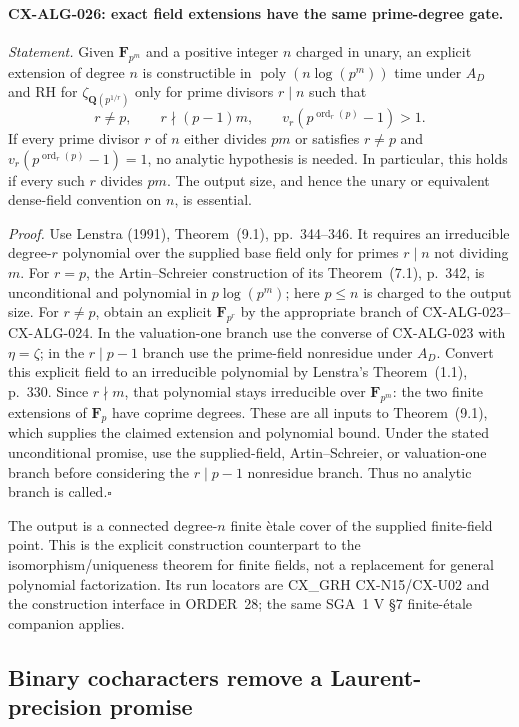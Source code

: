 \documentclass[11pt,a4paper]{article}
\begin{document}
\paragraph{CX-ALG-026: exact field extensions have the same prime-degree gate.}
\emph{Statement.} Given $\mathbf F_{p^m}$ and a positive integer $n$
charged in unary, an explicit extension of degree $n$ is constructible
in $\operatorname{poly}(n\log(p^m))$ time under $A_D$ and RH for
$\zeta_{\mathbf Q(p^{1/r})}$ only for prime divisors $r\mid n$ such that
\[
       r\ne p,\qquad r\nmid(p-1)m,\qquad
               v_r(p^{\operatorname{ord}_r(p)}-1)>1.
\]
If every prime divisor $r$ of $n$ either divides $pm$ or satisfies
$r\ne p$ and $v_r(p^{\operatorname{ord}_r(p)}-1)=1$, no analytic
hypothesis is needed. In particular, this holds if every such $r$ divides
$pm$. The output size, and hence the unary or equivalent dense-field
convention on $n$, is essential.

\emph{Proof.} Use Lenstra (1991), Theorem~(9.1), pp.~344--346.
It requires an irreducible degree-$r$ polynomial over the supplied base
field only for primes $r\mid n$ not dividing $m$.
For $r=p$, the Artin--Schreier construction of its Theorem~(7.1),
p.~342, is unconditional and polynomial in $p\log(p^m)$; here
$p\le n$ is charged to the output size. For $r\ne p$, obtain an
explicit $\mathbf F_{p^r}$ by the appropriate branch of
CX-ALG-023--CX-ALG-024. In the valuation-one branch use the converse
of CX-ALG-023 with $\eta=\zeta$; in the $r\mid p-1$ branch use
the prime-field nonresidue under $A_D$.
Convert this explicit field to an irreducible polynomial by Lenstra's
Theorem~(1.1), p.~330. Since $r\nmid m$, that polynomial stays
irreducible over $\mathbf F_{p^m}$: the two finite extensions of
$\mathbf F_p$ have coprime degrees. These are all inputs to
Theorem~(9.1), which supplies the claimed extension and polynomial
bound. Under the stated unconditional promise, use the supplied-field,
Artin--Schreier, or valuation-one branch before considering the
$r\mid p-1$ nonresidue branch. Thus no analytic branch is called.\hfill$\square$

The output is a connected degree-$n$ finite \`etale cover of the
supplied finite-field point. This is the explicit construction counterpart
to the isomorphism/uniqueness theorem for finite fields, not a replacement
for general polynomial factorization. Its run locators are CX\_GRH
CX-N15/CX-U02 and the construction interface in ORDER~28; the same
SGA~1 V \S7 finite-\'etale companion applies.

\subsection{Binary cocharacters remove a Laurent-precision promise}
\end{document}
